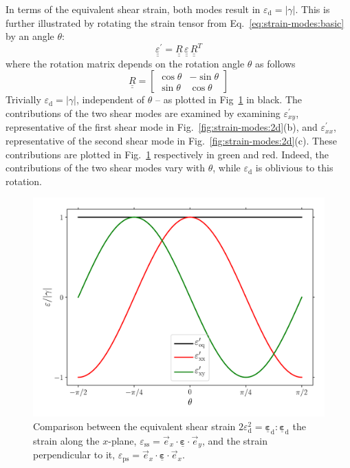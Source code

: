 \documentclass[times,namecite]{goose-article}
\newcommand\T[1]{\underline{\bm{{#1}}}}
\begin{document}
In terms of the equivalent shear strain, both modes result in $\varepsilon_\mathrm{d} = | \gamma |$. This is further illustrated by rotating the strain tensor from Eq.~\eqref{eq:strain-modes:basic} by an angle $\theta$:
\begin{equation}
  \underline{\underline{\varepsilon}}^\prime
  =
  \underline{\underline{R}} \,
  \underline{\underline{\varepsilon}} \,
  \underline{\underline{R}}^T
\end{equation}
where the rotation matrix depends on the rotation angle $\theta$ as follows
\begin{equation}
  \underline{\underline{R}}
  =
  \begin{bmatrix}
    \cos \theta & - \sin \theta \\
    \sin \theta &   \cos \theta
  \end{bmatrix}
\end{equation}
Trivially $\varepsilon_\mathrm{d} = | \gamma |$, independent of $\theta$ -- as plotted in Fig~\ref{fig:shear-modes:epseq} in black. The contributions of the two shear modes are examined by examining $\varepsilon^\prime_{xy}$, representative of the first shear mode in Fig.~\ref{fig:strain-modes:2d}(b), and $\varepsilon^\prime_{xx}$, representative of the second shear mode in Fig.~\ref{fig:strain-modes:2d}(c). These contributions are plotted in Fig.~\ref{fig:shear-modes:epseq} respectively in green and red. Indeed, the contributions of the two shear modes vary with $\theta$, while $\varepsilon_\mathrm{d}$ is oblivious to this rotation.

\begin{figure}[htp]
  \centering
  \includegraphics[width=.5\textwidth]{figures/strain-modes_2d_epseq}
  \caption{Comparison between the equivalent shear strain $2 \varepsilon_\mathrm{d}^2 = \T{\varepsilon}_\mathrm{d} : \T{\varepsilon}_\mathrm{d}$ the strain along the $x$-plane, $\varepsilon_\mathrm{ss} = \vec{e}_x \cdot \T{\varepsilon} \cdot \vec{e}_y$, and the strain perpendicular to it, $\varepsilon_\mathrm{ps} = \vec{e}_x \cdot \T{\varepsilon} \cdot \vec{e}_x$.}
  \label{fig:shear-modes:epseq}
\end{figure}
\end{document}
